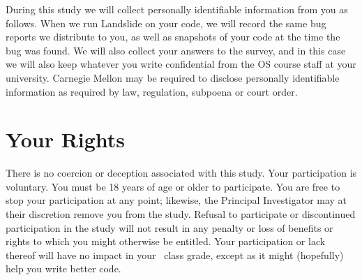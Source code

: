 \documentclass{article}
\begin{document}
During this study we will collect personally identifiable information from you as follows. When we run Landslide on your code, we will record the same bug reports we distribute to you, as well as snapshots of your code at the time the bug was found.
We will also collect your answers to the survey, and in this case we will also keep whatever you write confidential from the OS course staff at your university.
Carnegie Mellon may be required to disclose personally identifiable information as required by law, regulation, subpoena or court order.
%
%

\section{Your Rights}
There is no coercion or deception associated with this study.
Your participation is voluntary.
You must be 18 years of age or older to participate.
You are free to stop your participation at any point; likewise, the Principal Investigator may at their discretion remove you from the study.
Refusal to participate or discontinued participation in the study will not result in any penalty or loss of benefits or rights to which you might otherwise be entitled.
Your participation or lack thereof will have no impact in your \classname~class grade, except as it might (hopefully) help you write better code.
\\
\end{document}
